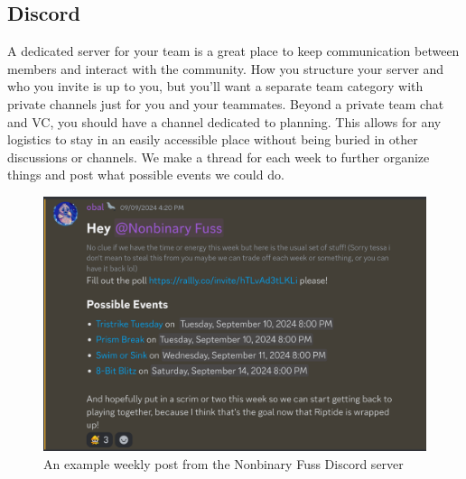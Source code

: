 \documentclass[12pt]{article}
\begin{document}
\subsection{Discord}
A dedicated server for your team is a great place to keep communication between members and interact with the community. How you structure your server and who you invite is up to you, but you'll want a separate team category with private channels just for you and your teammates. Beyond a private team chat and VC, you should have a channel dedicated to planning. This allows for any logistics to stay in an easily accessible place without being buried in other discussions or channels. We make a thread for each week to further organize things and post what possible events we could do. 
\begin{figure}[H]
\centering
    \includegraphics[width=.95\linewidth]{discord_planning.png}
\caption{An example weekly post from the Nonbinary Fuss Discord server}
\end{figure}
\end{document}
